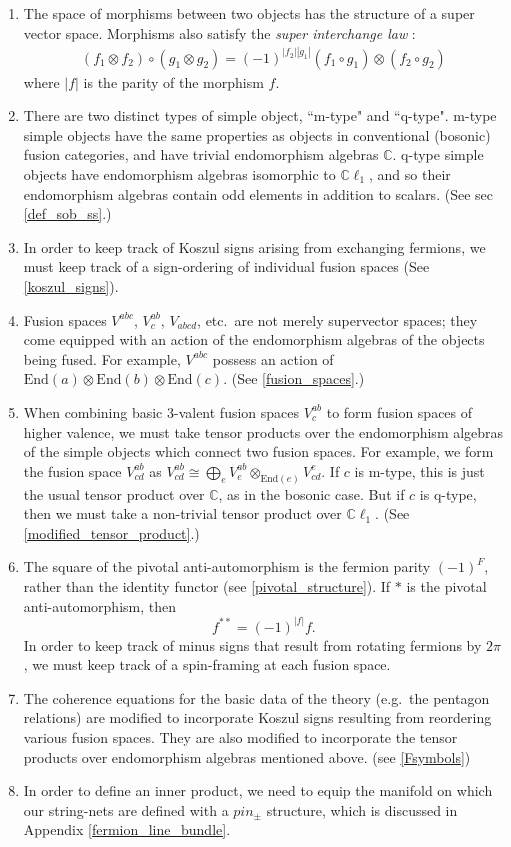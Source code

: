 \documentclass[12pt,a4paper]{article}
\newcommand{\tp}{\otimes}
\newcommand{\cc}{\mathbb{C}}
\newcommand\be            {\begin{equation}}
\newcommand\ee            {\end{equation}}
\newcommand{\End}{\text{End}}
\newcommand{\cl}{\mathbb{C}\ell}
\begin{document}
\begin{enumerate}
	\item The space of morphisms between two objects has the structure of 
	a super vector space.
	Morphisms also satisfy the {\em super interchange law} \cite{usher2016}:
	\begin{align}
	(f_1\tp f_2) \circ (g_1\tp g_2) = (-1)^{|f_2| |g_1|} (f_1\circ g_1)\tp (f_2\circ g_2)
	\end{align}
	where $|f|$ is the parity of the morphism $f$. 
	\item There are two distinct types of simple object, ``m-type" and ``q-type".
	m-type simple objects have the same properties as objects in conventional (bosonic) fusion categories, and have trivial endomorphism algebras $\cc$.  
	q-type simple objects have endomorphism algebras isomorphic to $\cl_1$, 
	and so their endomorphism algebras contain odd elements in addition to scalars. (See sec \ref{def_sob_ss}.)
	\item In order to keep track of Koszul signs arising from exchanging fermions, 
	we must keep track of a sign-ordering of individual fusion spaces (See \ref{koszul_signs}).
	\item Fusion spaces $V^{abc}$, $V^{ab}_c$, $V_{abcd}$, etc.\ are not merely supervector spaces; they come equipped with an action of the
	endomorphism algebras of the objects being fused. 
	For example, $V^{abc}$ possess an action of $\End(a)\tp \End(b)\tp \End(c)$.
	(See \ref{fusion_spaces}.)
	\item When combining basic 3-valent fusion spaces $V^{ab}_c$ to form fusion spaces of higher valence, we must take
	tensor products over the endomorphism algebras of the simple objects which connect two fusion spaces. 
	For example, we form the fusion space $V^{ab}_{cd}$ as $V^{ab}_{cd} \cong \bigoplus_e V^{ab}_e \tp_{\End(e)} V^e_{cd}$.
	If $c$ is m-type, this is just the usual tensor product over $\cc$, as in the bosonic case.
	But if $c$ is q-type, then we must take a non-trivial tensor product over $\cl_1$.
	(See \ref{modified_tensor_product}.)
	\item The square of the pivotal anti-automorphism is 
	the fermion parity $(-1)^F$, rather than the identity functor (see \ref{pivotal_structure}). 
	If $*$ is the pivotal anti-automorphism, then 
	\be f^{**} = (-1)^{|f|}f.\ee
	In order to keep track of minus signs that result from rotating fermions by $2\pi$, we must keep track of a spin-framing at each fusion space. 
	\item The coherence equations for the basic data of the theory (e.g.\ the pentagon relations) are modified to incorporate  
	 Koszul signs resulting from reordering various fusion spaces. 
	 They are also modified to incorporate the tensor products over endomorphism algebras mentioned above. (see \ref{Fsymbols})
	\item In order to define an inner product, we need to equip the manifold on which our string-nets are 
	defined with a $pin_\pm$ structure, which is discussed in Appendix \ref{fermion_line_bundle}.
\end{enumerate}
\end{document}
